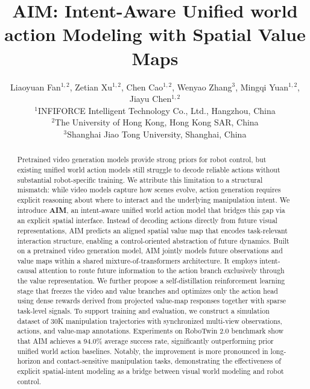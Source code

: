 \documentclass{article}
\title{AIM: Intent-Aware Unified world action Modeling with Spatial Value Maps}
\author{%
  \textrm{Liaoyuan Fan}$^{1,2}$, \textrm{Zetian Xu}$^{1,2}$, \textrm{Chen Cao}$^{1,2}$, \textrm{Wenyao Zhang}$^{3}$, \textrm{Mingqi Yuan}$^{1,2}$, \textrm{Jiayu Chen}$^{1,2}$ \\[0.8em]
  $^{1}$INFIFORCE Intelligent Technology Co., Ltd., Hangzhou, China \\
  $^{2}$The University of Hong Kong, Hong Kong SAR, China \\
  $^{3}$Shanghai Jiao Tong University, Shanghai, China  \\[0.8em]
}
\newcommand{\method}{AIM\xspace}
\begin{document}
\maketitle

\begin{abstract}
Pretrained video generation models provide strong priors for robot control, but existing unified world action models still struggle to decode reliable actions without substantial robot-specific training. We attribute this limitation to a structural mismatch: while video models capture how scenes evolve, action generation requires explicit reasoning about where to interact and the underlying manipulation intent.
We introduce \textbf{\method}, an intent-aware unified world action model that bridges this gap via an explicit spatial interface. Instead of decoding actions directly from future visual representations, \method predicts an aligned spatial value map that encodes task-relevant interaction structure, enabling a control-oriented abstraction of future dynamics. Built on a pretrained video generation model, \method jointly models future observations and value maps within a shared mixture-of-transformers architecture. It employs intent-causal attention to route future information to the action branch exclusively through the value representation. We further propose a self-distillation reinforcement learning stage that freezes the video and value branches and optimizes only the action head using dense rewards derived from projected value-map responses together with sparse task-level signals. To support training and evaluation, we construct a simulation dataset of 30K manipulation trajectories with synchronized multi-view observations, actions, and value-map annotations. Experiments on RoboTwin 2.0 benchmark show that \method achieves a 94.0\% average success rate, significantly outperforming prior unified world action baselines. Notably, the improvement is more pronounced in long-horizon and contact-sensitive manipulation tasks, demonstrating the effectiveness of explicit spatial-intent modeling as a bridge between visual world modeling and robot control.

\end{abstract}
\end{document}
